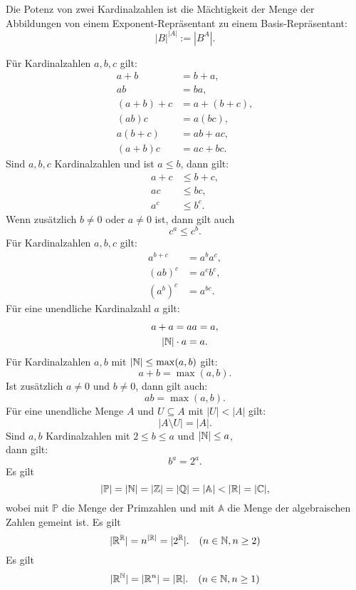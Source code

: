 \begin{definition}
Die Potenz von zwei Kardinalzahlen ist die Mächtigkeit
der Menge der Abbildungen von einem Exponent-Repräsentant
zu einem Basis-Repräsentant:%
\begin{equation}
|B|^{|A|} := |B^A|.
\end{equation}
\end{definition}
Für Kardinalzahlen $a,b,c$ gilt:
\begin{align}
a+b &= b+a,\\
ab &= ba,\\
(a+b)+c &= a+(b+c),\\
(ab)c &= a(bc),\\
a(b+c) &= ab+ac,\\
(a+b)c &= ac+bc.
\end{align}
Sind $a,b,c$ Kardinalzahlen und ist $a\le b$, dann gilt:
\begin{align}
a+c &\le b+c,\\
ac &\le bc,\\
a^c &\le b^c.
\end{align}
Wenn zusätzlich $b\ne 0$ oder $a\ne 0$ ist, dann gilt auch
\begin{equation}
c^a \le c^b.
\end{equation}
Für Kardinalzahlen $a,b,c$ gilt:
\begin{align}
a^{b+c} &= a^b a^c,\\
(ab)^c &= a^c b^c,\\
(a^b)^c &= a^{bc}.
\end{align}
Für eine unendliche Kardinalzahl $a$ gilt:
\begin{gather}
a+a = aa = a,\\
|\mathbb N|\cdot a = a.
\end{gather}
Für Kardinalzahlen $a,b$ mit $|\mathbb N|\le\max(a,b)$ gilt:
\begin{equation}
a+b = \max(a,b).
\end{equation}
Ist zusätzlich $a\ne 0$ und $b\ne 0$, dann gilt auch:
\begin{equation}
ab = \max(a,b).
\end{equation}
Für eine unendliche Menge $A$ und $U\subseteq A$ mit $|U|<|A|$ gilt:
\begin{equation}
|A\setminus U| = |A|.
\end{equation}
Sind $a,b$ Kardinalzahlen mit $2\le b\le a$ und $|\mathbb N|\le a$,\\
dann gilt:
\begin{equation}
b^a = 2^a.
\end{equation}
Es gilt
\begin{equation}
|\mathbb P| = |\mathbb N| = |\mathbb Z| = |\mathbb Q| = |\mathbb A| < |\mathbb R| = |\mathbb C|,
\end{equation}
wobei mit $\mathbb P$ die Menge der Primzahlen und mit $\mathbb A$ die
Menge der algebraischen Zahlen gemeint ist. Es gilt
\begin{equation}
|\mathbb R^\mathbb R| = n^{|\mathbb R|} = |2^\mathbb R|.\quad (n\in\mathbb N, n\ge 2)
\end{equation}
Es gilt
\begin{equation}
|\mathbb R^\mathbb N| = |\mathbb R^n| = |\mathbb R|.\quad (n\in\mathbb N, n\ge 1)
\end{equation}

